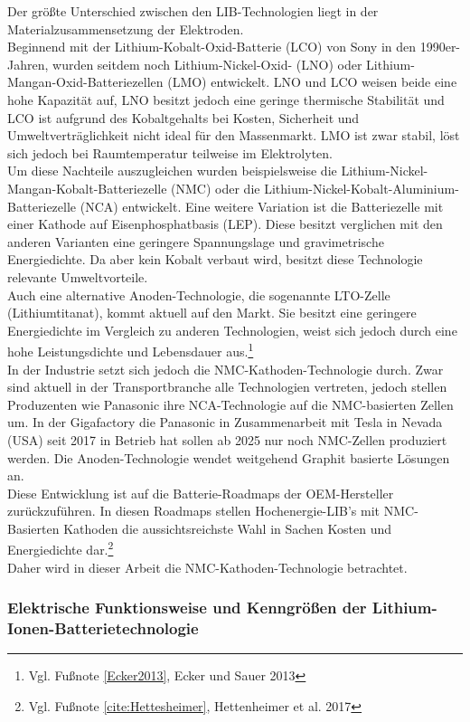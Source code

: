 Der größte Unterschied zwischen den LIB-Technologien liegt in der Materialzusammensetzung der Elektroden.\\
Beginnend mit der Lithium-Kobalt-Oxid-Batterie (LCO) von Sony in den 1990er-Jahren, wurden seitdem noch Lithium-Nickel-Oxid- (LNO) oder Lithium-Mangan-Oxid-Batteriezellen (LMO) entwickelt. LNO und LCO weisen beide eine hohe Kapazität auf, LNO besitzt jedoch eine geringe thermische Stabilität und LCO ist aufgrund des Kobaltgehalts bei Kosten, Sicherheit und Umweltverträglichkeit nicht ideal für den Massenmarkt. LMO ist zwar stabil, löst sich jedoch bei Raumtemperatur teilweise im Elektrolyten. \\
Um diese Nachteile auszugleichen wurden beispielsweise die Lithium-Nickel-Mangan-Kobalt-Batteriezelle (NMC) oder die Lithium-Nickel-Kobalt-Aluminium-Batteriezelle (NCA) entwickelt. Eine weitere Variation ist die Batteriezelle mit einer Kathode auf Eisenphosphatbasis (LEP). Diese besitzt verglichen mit den anderen Varianten eine geringere Spannungslage und gravimetrische Energiedichte. Da aber kein Kobalt verbaut wird, besitzt diese Technologie relevante Umweltvorteile.\\
Auch eine alternative Anoden-Technologie, die sogenannte LTO-Zelle (Lithiumtitanat), kommt aktuell auf den Markt. Sie besitzt eine geringere Energiedichte im Vergleich zu anderen Technologien, weist sich jedoch durch eine hohe Leistungsdichte und Lebensdauer aus.\footnote{Vgl. Fußnote \ref{Ecker2013}, Ecker und Sauer 2013}  \\
In der Industrie setzt sich jedoch die NMC-Kathoden-Technologie durch. Zwar sind aktuell in der Transportbranche alle Technologien vertreten, jedoch stellen Produzenten wie Panasonic ihre NCA-Technologie auf die NMC-basierten Zellen um. In der Gigafactory die Panasonic in Zusammenarbeit mit Tesla in Nevada (USA) seit 2017 in Betrieb hat sollen ab 2025 nur noch NMC-Zellen produziert werden. Die Anoden-Technologie wendet weitgehend Graphit basierte Lösungen an.\\
Diese Entwicklung ist auf die Batterie-Roadmaps der OEM-Hersteller zurückzuführen. In diesen Roadmaps stellen Hochenergie-LIB's mit NMC-Basierten Kathoden die aussichtsreichste Wahl in Sachen Kosten und Energiedichte dar.\footnote{Vgl. Fußnote \ref{cite:Hettesheimer}, Hettenheimer et al. 2017} \\
Daher wird in dieser Arbeit die NMC-Kathoden-Technologie betrachtet.%

\subsubsection*{Elektrische Funktionsweise und Kenngrößen der Lithium-Ionen-Batterietechnologie}\label{subsub:ElekChemFunktion}

